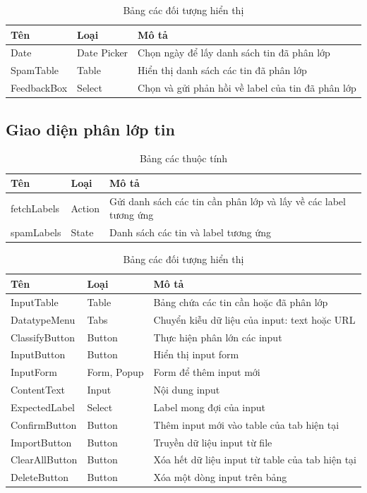   \begin{table}[H]
    \centering
    \setlength{\tabcolstep}{12pt}
    \begin{tabular}{@{}lll@{}} \toprule
      Tên  & Loại   & Mô tả \\ \midrule
      Date  &  Date Picker & Chọn ngày để lấy danh sách tin đã phân lớp \\
      SpamTable  & Table & Hiển thị danh sách các tin đã phân lớp \\
      FeedbackBox & Select & Chọn và gửi phản hồi về label của tin đã phân lớp \\ \bottomrule
    \end{tabular}
    \caption{Bảng các đối tượng hiển thị}
  \end{table}

  \subsection{Giao diện phân lớp tin}
  \begin{table}[H]
    \centering
    \setlength{\tabcolstep}{12pt}
    \begin{tabular}{@{}lll@{}} \toprule
      Tên  & Loại   & Mô tả \\ \midrule
      fetchLabels &  Action   &  Gửi danh sách các tin cần phân lớp và lấy về các label tương ứng \\
      spamLabels  &  State  & Danh sách các tin và label tương ứng \\ \bottomrule
    \end{tabular}
    \caption{Bảng các thuộc tính}
  \end{table}

  \begin{table}[H]
    \centering
    \setlength{\tabcolstep}{12pt}
    \begin{tabular}{@{}lll@{}} \toprule
      Tên  & Loại   & Mô tả \\ \midrule
      InputTable   &  Table & Bảng chứa các tin cần hoặc đã phân lớp \\
      DatatypeMenu   & Tabs & Chuyển kiễu dữ liệu của input: text hoặc URL \\
      ClassifyButton  & Button  & Thực hiện phân lớn các input \\
      InputButton   & Button & Hiển thị input form \\
      InputForm   & Form, Popup & Form để thêm input mới \\
      ContentText & Input & Nội dung input \\
      ExpectedLabel & Select & Label mong đợi của input \\
      ConfirmButton & Button & Thêm input mới vào table của tab hiện tại \\
      ImportButton & Button & Truyền dữ liệu input từ file \\
      ClearAllButton & Button & Xóa hết dữ liệu input từ table của tab hiện tại \\
      DeleteButton & Button & Xóa một dòng input trên bảng \\ \bottomrule
    \end{tabular}
    \caption{Bảng các đối tượng hiển thị}
  \end{table}

